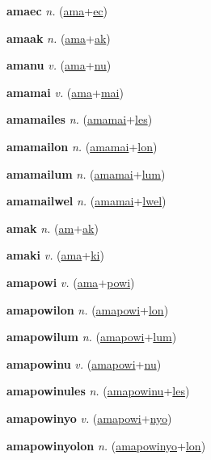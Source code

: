 \textbf{\hypertarget{amaec}{amaec}} \textit{n.} (\hyperlink{ama}{ama}+\allowbreak \hyperlink{ec}{ec})


\textbf{\hypertarget{amaak}{amaak}} \textit{n.} (\hyperlink{ama}{ama}+\allowbreak \hyperlink{ak}{ak})


\textbf{\hypertarget{amanu}{amanu}} \textit{v.} (\hyperlink{ama}{ama}+\allowbreak \hyperlink{nu}{nu})


\textbf{\hypertarget{amamai}{amamai}} \textit{v.} (\hyperlink{ama}{ama}+\allowbreak \hyperlink{mai}{mai})


\textbf{\hypertarget{amamailes}{amamailes}} \textit{n.} (\hyperlink{amamai}{amamai}+\allowbreak \hyperlink{les}{les})


\textbf{\hypertarget{amamailon}{amamailon}} \textit{n.} (\hyperlink{amamai}{amamai}+\allowbreak \hyperlink{lon}{lon})


\textbf{\hypertarget{amamailum}{amamailum}} \textit{n.} (\hyperlink{amamai}{amamai}+\allowbreak \hyperlink{lum}{lum})


\textbf{\hypertarget{amamailwel}{amamailwel}} \textit{n.} (\hyperlink{amamai}{amamai}+\allowbreak \hyperlink{lwel}{lwel})


\textbf{\hypertarget{amak}{amak}} \textit{n.} (\hyperlink{am}{am}+\allowbreak \hyperlink{ak}{ak})


\textbf{\hypertarget{amaki}{amaki}} \textit{v.} (\hyperlink{ama}{ama}+\allowbreak \hyperlink{ki}{ki})


\textbf{\hypertarget{amapowi}{amapowi}} \textit{v.} (\hyperlink{ama}{ama}+\allowbreak \hyperlink{powi}{powi})


\textbf{\hypertarget{amapowilon}{amapowilon}} \textit{n.} (\hyperlink{amapowi}{amapowi}+\allowbreak \hyperlink{lon}{lon})


\textbf{\hypertarget{amapowilum}{amapowilum}} \textit{n.} (\hyperlink{amapowi}{amapowi}+\allowbreak \hyperlink{lum}{lum})


\textbf{\hypertarget{amapowinu}{amapowinu}} \textit{v.} (\hyperlink{amapowi}{amapowi}+\allowbreak \hyperlink{nu}{nu})


\textbf{\hypertarget{amapowinules}{amapowinules}} \textit{n.} (\hyperlink{amapowinu}{amapowinu}+\allowbreak \hyperlink{les}{les})


\textbf{\hypertarget{amapowinyo}{amapowinyo}} \textit{v.} (\hyperlink{amapowi}{amapowi}+\allowbreak \hyperlink{nyo}{nyo})


\textbf{\hypertarget{amapowinyolon}{amapowinyolon}} \textit{n.} (\hyperlink{amapowinyo}{amapowinyo}+\allowbreak \hyperlink{lon}{lon})


